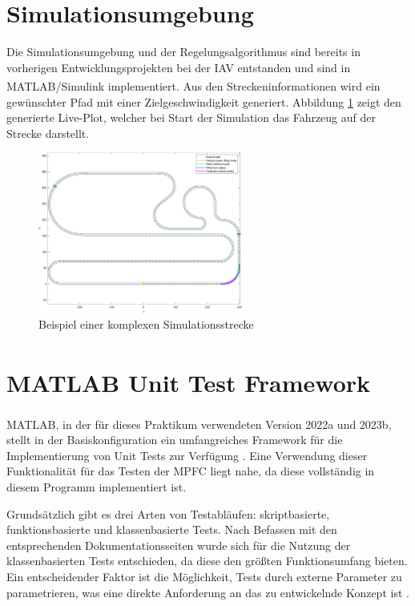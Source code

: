\section{Simulationsumgebung} \label{sec:Simulationsumgebung}
Die Simulationsumgebung und der Regelungsalgorithmus sind bereits in vorherigen Entwicklungsprojekten bei der IAV entstanden und sind in MATLAB\textsuperscript{\textregistered}/Simulink implementiert. Aus den Streckeninformationen wird ein gewünschter Pfad mit einer Zielgeschwindigkeit generiert. Abbildung \ref{fig:Simulation_Strecke} zeigt den generierte Live-Plot, welcher bei Start der Simulation das Fahrzeug auf der Strecke darstellt.
\begin{figure}
    \centering
    \includegraphics[width=0.6\textwidth]{figures/3_Implementierung/simulationsumgebung.pdf}
    \caption{Beispiel einer komplexen Simulationsstrecke}
    \label{fig:Simulation_Strecke}
\end{figure}

\section{MATLAB\textsuperscript{\textregistered} Unit Test Framework} \label{sec:MatlabUnitTest}
MATLAB\textsuperscript{\textregistered}, in der für dieses Praktikum verwendeten Version 2022a und 2023b, stellt in der Basiskonfiguration ein umfangreiches Framework für die Implementierung von Unit Tests zur Verfügung \cite{matlabTest}. Eine Verwendung dieser Funktionalität für das Testen der MPFC liegt nahe, da diese vollständig in diesem Programm implementiert ist.

Grundsätzlich gibt es drei Arten von Testabläufen: skriptbasierte, funktionsbasierte und klassenbasierte Tests. Nach Befassen mit den entsprechenden Dokumentationsseiten wurde sich für die Nutzung der klassenbasierten Tests entschieden, da diese den größten Funktionsumfang bieten. Ein entscheidender Faktor ist die Möglichkeit, Tests durch externe Parameter zu parametrieren, was eine direkte Anforderung an das zu entwickelnde Konzept ist \cite{matlabTest}.

